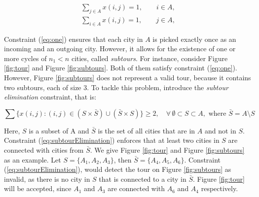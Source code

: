 \documentclass{mprop}
\theoremstyle{definition}
\begin{document}
\begin{equation}
\label{eq:one}
\begin{split}
  \sum_{j \in A} x(i,j) = 1, \qquad i \in A,\\
  \sum_{i \in A} x(i,j) = 1, \qquad j \in A,
\end{split}
\end{equation}

Constraint (\ref{eq:one}) ensures that each city in $A$ is picked exactly once as an incoming and an outgoing city. However, it allows for the existence of one or more cycles of $n_{1} < n$ cities, called \textit{subtours}. For instance, consider Figure \ref{fig:tour} and Figure \ref{fig:subtours}. Both of them satisfy constraint (\ref{eq:one}). However, Figure \ref{fig:subtours} does not represent a valid tour, because it contains two subtours, each of size 3. To tackle this problem, \citet{Dantzig54} introduce the \textit{subtour elimination} constraint, that is:

\begin{equation}
\label{eq:subtourElimination}
\sum \{x(i,j) : (i,j) \in (S \times \bar{S}) \cup (\bar{S} \times S)\} \geq 2, \quad \forall \, \emptyset \subset S \subset A, \textrm{ where } \bar{S} = A \setminus S
\end{equation}

Here, $S$ is a subset of A and $\bar{S}$ is the set of all cities that are in $A$ and not in $S$. Constraint (\ref{eq:subtourElimination}) enforces that at least two cities in $S$ are connected with cities from $\bar{S}$. We give Figure \ref{fig:tour} and Figure \ref{fig:subtours} as an example. Let $S = \{A_{1},A_{2},A_{3}\}$, then $\bar{S} = \{A_{4},A_{5},A_{6}\}$. Constraint (\ref{eq:subtourElimination}), would detect the tour on Figure \ref{fig:subtours} as invalid, as there is no city in $S$ that is connected to a city in $\bar{S}$. Figure \ref{fig:tour} will be accepted, since $A_{1}$ and $A_{3}$ are connected with $A_{6}$ and $A_{4}$ respectively.
\end{document}
